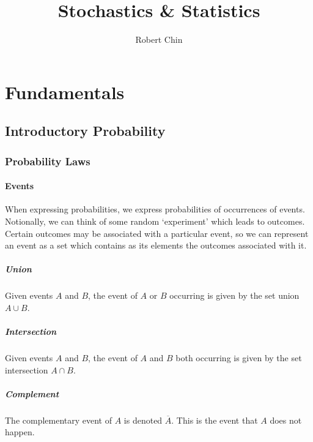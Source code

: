 \documentclass[11pt]{report} %
\title{Stochastics \& Statistics}
\author{Robert Chin}
\begin{document}
\maketitle
\thispagestyle{fancy}

\tableofcontents

\part{Fundamentals}

\chapter{Introductory Probability}

\section{Probability Laws}

\subsection{Events}

When expressing probabilities, we express probabilities of occurrences of events. Notionally, we can think of some random `experiment' which leads to outcomes. Certain outcomes may be associated with a particular event, so we can represent an event as a set which contains as its elements the outcomes associated with it.

\subsubsection{Union}

Given events $A$ and $B$, the event of $A$ or $B$ occurring is given by the set union $A \cup B$.

\subsubsection{Intersection}

Given events $A$ and $B$, the event of $A$ and $B$ both occurring is given by the set intersection $A \cap B$.

\subsubsection{Complement}

The complementary event of $A$ is denoted $\overline{A}$. This is the event that $A$ does not happen. \\
\end{document}
